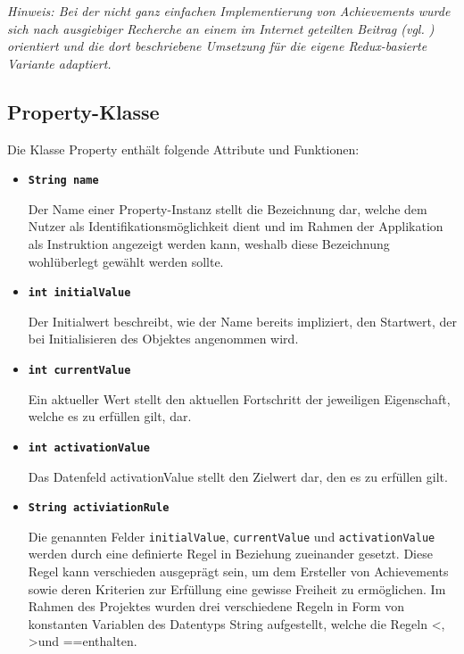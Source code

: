 \documentclass[bibliography=totoc,listof=totoc,BCOR=5mm,DIV=12,oneside]{scrbook}
\begin{document}
{\par \textit{Hinweis: Bei der nicht ganz einfachen Implementierung von Achievements wurde sich nach ausgiebiger Recherche an einem im Internet geteilten Beitrag (vgl. \citep{AchievementsImplementation}) orientiert und die dort beschriebene Umsetzung für die eigene Redux-basierte Variante adaptiert.}

\subsection{Property-Klasse}
\label{sub:propertyclass}
\par \medskip Die Klasse Property enthält folgende Attribute und Funktionen:

\begin{itemize}
\item[] \texttt{\textbf{String name}}
\par Der Name einer Property-Instanz stellt die Bezeichnung dar, welche dem Nutzer als Identifikationsmöglichkeit dient und im Rahmen der Applikation als Instruktion angezeigt werden kann, weshalb diese Bezeichnung wohlüberlegt gewählt werden sollte. 

\item[] \texttt{\textbf{int initialValue}}
\par Der Initialwert beschreibt, wie der Name bereits impliziert, den Startwert, der bei Initialisieren des Objektes angenommen wird.

\item[] \texttt{\textbf{int currentValue}}
\par Ein aktueller Wert stellt den aktuellen Fortschritt der jeweiligen Eigenschaft, welche es zu erfüllen gilt, dar. 

\item[] \texttt{\textbf{int activationValue}}
\par Das Datenfeld activationValue stellt den Zielwert dar, den es zu erfüllen gilt.

\item[] \texttt{\textbf{String activiationRule}}
\par Die genannten Felder \texttt{initialValue}, \texttt{currentValue} und \texttt{activationValue} werden durch eine definierte Regel in Beziehung zueinander gesetzt. Diese Regel kann verschieden ausgeprägt sein, um dem Ersteller von Achievements sowie deren Kriterien zur Erfüllung eine gewisse Freiheit zu ermöglichen. Im Rahmen des Projektes wurden drei verschiedene Regeln in Form von konstanten Variablen des Datentyps String aufgestellt, welche die Regeln \grqq <\grqq, \grqq >\grqq und \grqq ==\grqq enthalten. 


\end{itemize}}
\end{document}
